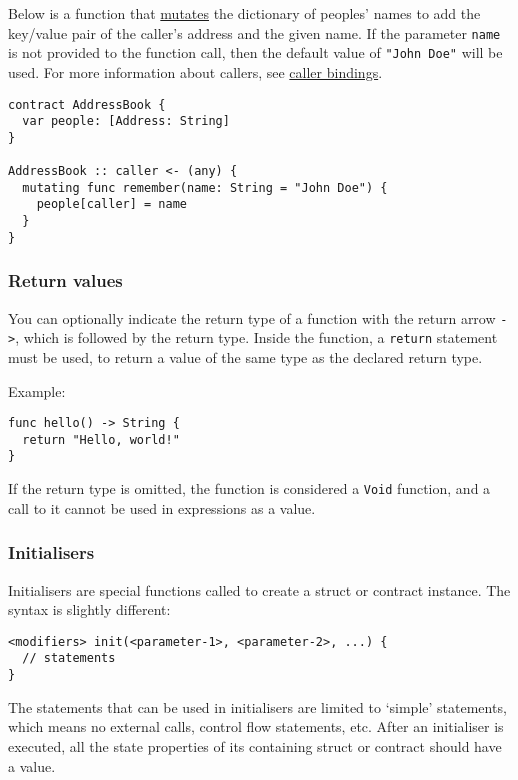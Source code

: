 Below is a function that \hyperref[sec:appendix-b-function-modifiers]{mutates} the dictionary of peoples' names to add the key/value pair of the caller's address and the given name. If the parameter \texttt{name} is not provided to the function call, then the default value of \texttt{"John Doe"} will be used. For more information about callers, see \hyperref[sec:appendix-b-caller-group-variable]{caller bindings}.

\begin{verbatim}
contract AddressBook {
  var people: [Address: String]
}

AddressBook :: caller <- (any) {
  mutating func remember(name: String = "John Doe") {
    people[caller] = name
  }
}
\end{verbatim}

\subsubsection{Return values}
\label{sec:appendix-b-return-values}

You can optionally indicate the return type of a function with the return arrow \texttt{->}, which is followed by the return type. Inside the function, a \texttt{return} statement must be used, to return a value of the same type as the declared return type.

Example:

\begin{verbatim}
func hello() -> String {
  return "Hello, world!"
}
\end{verbatim}

If the return type is omitted, the function is considered a \texttt{Void} function, and a call to it cannot be used in expressions as a value.

\subsubsection{Initialisers}
\label{sec:appendix-b-initialisers}

Initialisers are special functions called to create a struct or contract instance. The syntax is slightly different:

\begin{verbatim}
<modifiers> init(<parameter-1>, <parameter-2>, ...) {
  // statements
}
\end{verbatim}

The statements that can be used in initialisers are limited to `simple' statements, which means no external calls, control flow statements, etc. After an initialiser is executed, all the state properties of its containing struct or contract should have a value.

